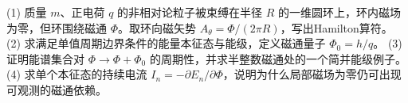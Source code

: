 (1) 质量 \(m\)、正电荷 \(q\) 的非相对论粒子被束缚在半径 \(R\) 的一维圆环上，环内磁场为零，但环围绕磁通 \(\Phi\)。取环向磁矢势 \(A_\theta=\Phi/(2\pi R)\)，写出Hamilton算符。
(2) 求满足单值周期边界条件的能量本征态与能级，定义磁通量子 \(\Phi_0=h/q\)。
(3) 证明能谱集合对 \(\Phi\to\Phi+\Phi_0\) 的周期性，并求半整数磁通处的一个简并能级例子。
(4) 求单个本征态的持续电流 \(I_n=-\partial E_n/\partial\Phi\)，说明为什么局部磁场为零仍可出现可观测的磁通依赖。
